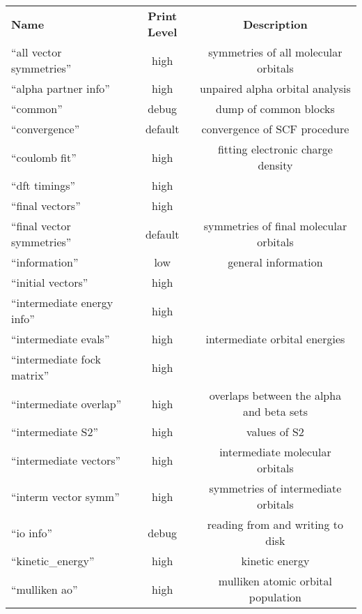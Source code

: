 \begin{table}[htbp]
\begin{center}
\begin{tabular}{lcc}
  {\bf Name}          & {\bf Print Level} & {\bf Description} \\
 ``all vector symmetries''          & high        & symmetries of all molecular orbitals \\
 ``alpha partner info''             & high        & unpaired alpha orbital analysis \\
 ``common''                         & debug       & dump of common blocks \\
 ``convergence''                    & default     & convergence of SCF procedure \\
 ``coulomb fit''                    & high        & fitting electronic charge density \\
 ``dft timings''                    & high        & \\
 ``final vectors''                  & high        & \\
 ``final vector symmetries''        & default     & symmetries of final molecular orbitals \\
 ``information''                    & low         & general information  \\
 ``initial vectors''                & high        & \\
 ``intermediate energy info''       & high        & \\
 ``intermediate evals''             & high        & intermediate orbital energies \\
 ``intermediate fock matrix''       & high        & \\
 ``intermediate overlap''           & high        & overlaps between the alpha and beta sets \\
 ``intermediate S2''                & high        & values of S2 \\
 ``intermediate vectors''           & high        & intermediate molecular orbitals \\
 ``interm vector symm''             & high        & symmetries of intermediate orbitals \\
 ``io info''                        & debug       & reading from and writing to disk  \\
 ``kinetic\_energy''                & high        & kinetic energy \\
 ``mulliken ao''                    & high        & mulliken atomic orbital population \\


\end{tabular}
\end{center}
\end{table}
